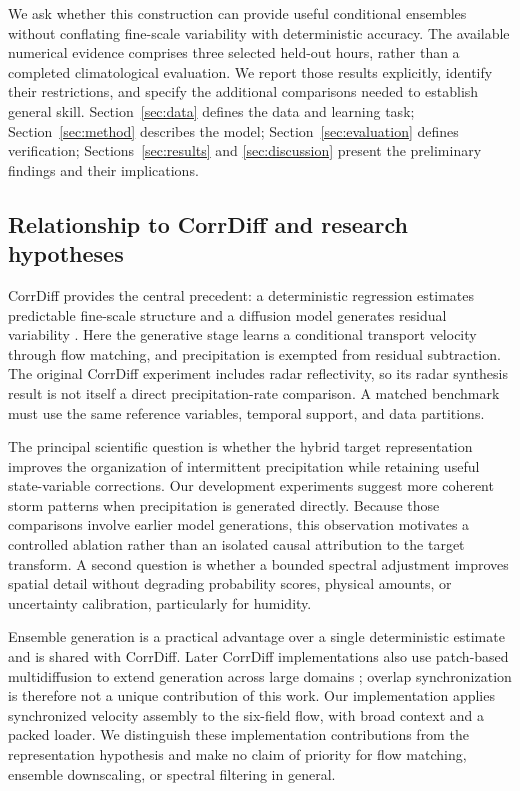 \documentclass[10pt]{article}
\begin{document}
We ask whether this construction can provide useful conditional ensembles without conflating fine-scale variability with deterministic accuracy. The available numerical evidence comprises three selected held-out hours, rather than a completed climatological evaluation. We report those results explicitly, identify their restrictions, and specify the additional comparisons needed to establish general skill. Section~\ref{sec:data} defines the data and learning task; Section~\ref{sec:method} describes the model; Section~\ref{sec:evaluation} defines verification; Sections~\ref{sec:results} and \ref{sec:discussion} present the preliminary findings and their implications.

\subsection{Relationship to CorrDiff and research hypotheses}\label{sec:corrdiff}
CorrDiff provides the central precedent: a deterministic regression estimates predictable fine-scale structure and a diffusion model generates residual variability \citep{mardani2025}. Here the generative stage learns a conditional transport velocity through flow matching, and precipitation is exempted from residual subtraction. The original CorrDiff experiment includes radar reflectivity, so its radar synthesis result is not itself a direct precipitation-rate comparison. A matched benchmark must use the same reference variables, temporal support, and data partitions.

The principal scientific question is whether the hybrid target representation improves the organization of intermittent precipitation while retaining useful state-variable corrections. Our development experiments suggest more coherent storm patterns when precipitation is generated directly. Because those comparisons involve earlier model generations, this observation motivates a controlled ablation rather than an isolated causal attribution to the target transform. A second question is whether a bounded spectral adjustment improves spatial detail without degrading probability scores, physical amounts, or uncertainty calibration, particularly for humidity.

Ensemble generation is a practical advantage over a single deterministic estimate and is shared with CorrDiff. Later CorrDiff implementations also use patch-based multidiffusion to extend generation across large domains \citep{sui2025}; overlap synchronization is therefore not a unique contribution of this work. Our implementation applies synchronized velocity assembly to the six-field flow, with broad context and a packed loader. We distinguish these implementation contributions from the representation hypothesis and make no claim of priority for flow matching, ensemble downscaling, or spectral filtering in general.
\end{document}
